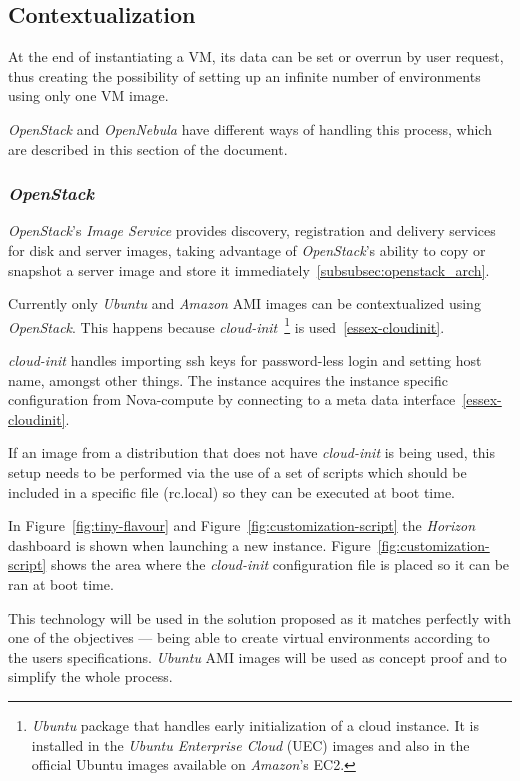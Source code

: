 \subsection{Contextualization}

At the end of instantiating a VM, its data can be set or overrun by user request, thus creating the possibility of setting up an infinite number of environments using only one VM image.

\textit{OpenStack} and \textit{OpenNebula} have different ways of handling this process, which are described in this section of the document.

\subsubsection{\textit{OpenStack}}

\textit{OpenStack}'s \textit{Image Service} provides discovery, registration and delivery services for disk and server images, taking advantage of \textit{OpenStack}'s ability to copy or snapshot a server image and store it immediately~\ref{subsubsec:openstack_arch}.

Currently only \textit{Ubuntu} and \textit{Amazon} AMI images can be contextualized using \textit{OpenStack}. This happens because \textit{cloud-init}~\footnote{\textit{Ubuntu} package that handles early initialization of a cloud instance. It is installed in the \textit{Ubuntu Enterprise Cloud} (UEC) images and also in the official Ubuntu images available on \textit{Amazon}'s EC2.} is used~\ref{essex-cloudinit}.

\textit{cloud-init} handles importing ssh keys for password-less login and setting host name, amongst other things. The instance acquires the instance specific configuration from Nova-compute by connecting to a meta data interface~\ref{essex-cloudinit}.

If an image from a distribution that does not have \textit{cloud-init} is being used, this setup needs to be performed via the use of a set of scripts which should be included in a specific file (rc.local) so they can be executed at boot time.

In Figure~\ref{fig:tiny-flavour} and Figure~\ref{fig:customization-script} the \textit{Horizon} dashboard is shown when launching a new instance. Figure~\ref{fig:customization-script} shows the area where the \textit{cloud-init} configuration file is placed so it can be ran at boot time.

This technology will be used in the solution proposed as it matches perfectly with one of the objectives --- being able to create virtual environments according to the users specifications. \textit{Ubuntu} AMI images will be used as concept proof and to simplify the whole process.

